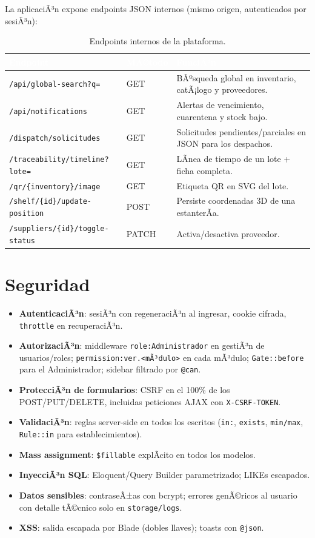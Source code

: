 ﻿\documentclass[a4paper, 12pt]{article}
\begin{document}
La aplicaciÃ³n expone endpoints JSON internos (mismo origen, autenticados por sesiÃ³n):
\begin{table}[H]
\centering
\begin{tabularx}{\textwidth}{|l|l|X|}
\hline
\rowcolor{ucsblue} \textcolor{white}{\textbf{Endpoint}} & \textcolor{white}{\textbf{MÃ©todo}} & \textcolor{white}{\textbf{FunciÃ³n}} \\ \hline
\texttt{/api/global-search?q=} & GET & BÃºsqueda global en inventario, catÃ¡logo y proveedores. \\ \hline
\texttt{/api/notifications} & GET & Alertas de vencimiento, cuarentena y stock bajo. \\ \hline
\texttt{/dispatch/solicitudes} & GET & Solicitudes pendientes/parciales en JSON para los despachos. \\ \hline
\texttt{/traceability/timeline?lote=} & GET & LÃ­nea de tiempo de un lote + ficha completa. \\ \hline
\texttt{/qr/\{inventory\}/image} & GET & Etiqueta QR en SVG del lote. \\ \hline
\texttt{/shelf/\{id\}/update-position} & POST & Persiste coordenadas 3D de una estanterÃ­a. \\ \hline
\texttt{/suppliers/\{id\}/toggle-status} & PATCH & Activa/desactiva proveedor. \\ \hline
\end{tabularx}
\caption{Endpoints internos de la plataforma.}
\end{table}

\section{Seguridad}
\begin{itemize}
    \item \textbf{AutenticaciÃ³n}: sesiÃ³n con regeneraciÃ³n al ingresar, cookie cifrada, \texttt{throttle} en recuperaciÃ³n.
    \item \textbf{AutorizaciÃ³n}: middleware \texttt{role:Administrador} en gestiÃ³n de usuarios/roles; \texttt{permission:ver.<mÃ³dulo>} en cada mÃ³dulo; \texttt{Gate::before} para el Administrador; sidebar filtrado por \texttt{@can}.
    \item \textbf{ProtecciÃ³n de formularios}: CSRF en el 100\% de los POST/PUT/DELETE, incluidas peticiones AJAX con \texttt{X-CSRF-TOKEN}.
    \item \textbf{ValidaciÃ³n}: reglas server-side en todos los escritos (\texttt{in:}, \texttt{exists}, \texttt{min/max}, \texttt{Rule::in} para establecimientos).
    \item \textbf{Mass assignment}: \texttt{\$fillable} explÃ­cito en todos los modelos.
    \item \textbf{InyecciÃ³n SQL}: Eloquent/Query Builder parametrizado; LIKEs escapados.
    \item \textbf{Datos sensibles}: contraseÃ±as con bcrypt; errores genÃ©ricos al usuario con detalle tÃ©cnico solo en \texttt{storage/logs}.
    \item \textbf{XSS}: salida escapada por Blade (dobles llaves); toasts con \texttt{@json}.
\end{itemize}
\end{document}
